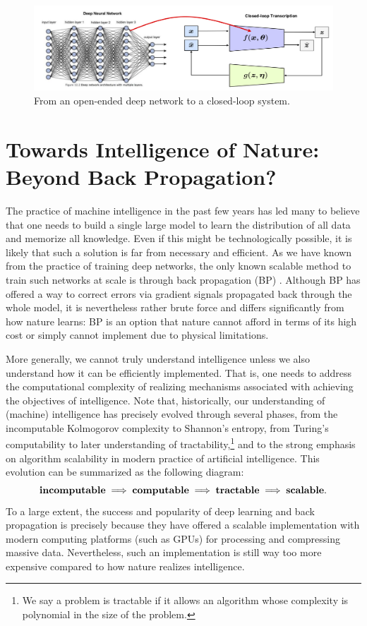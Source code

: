 \documentclass[../../book-main.tex]{subfiles}
\begin{document}
\begin{figure}[t]
    \centering    \includegraphics[width=0.9\linewidth]{figs_chap8/open-to-closed.png}
    \caption{From an open-ended deep network to a closed-loop system.}
    \label{fig:open-to-closed}
\end{figure}



\section{Towards Intelligence of Nature: Beyond Back Propagation?}
The practice of machine intelligence in the past few years has led many to believe that one needs to build a single large model to learn the distribution of all data and memorize all knowledge. Even if this might be technologically possible, it is likely that such a solution is far from necessary and efficient. As we have known from the practice of training deep networks, the only known scalable method to train such networks at scale is through back propagation (BP) \cite{Back-Prop}. Although BP has offered a way to correct errors via gradient signals propagated back through the whole model, it is nevertheless rather brute force and differs significantly from how nature learns: BP is an option that nature cannot afford in terms of its high cost or simply cannot implement due to physical limitations. 

More generally, we cannot truly understand intelligence unless we also understand how it can be efficiently implemented. That is, one needs to address the computational complexity of realizing mechanisms associated with achieving the objectives of intelligence. Note that, historically, our understanding of (machine) intelligence has precisely evolved through several phases, from the incomputable Kolmogorov complexity to Shannon's entropy, from Turing's computability to later understanding of  tractability,\footnote{We say a problem is tractable if it allows an algorithm whose complexity is polynomial in the size of the problem.} and to the strong emphasis on algorithm scalability in modern practice of artificial intelligence. This evolution can be summarized as the following diagram:
\begin{equation}
   \mbox{\textbf{incomputable}} \;
   \Longrightarrow \; \mbox{\textbf{computable}} \;
   \Longrightarrow \; \mbox{\textbf{tractable}} \; \Longrightarrow \; 
   \mbox{\textbf{scalable}}.
\end{equation}
To a large extent, the success and popularity of deep learning and back propagation is precisely because they have offered a  scalable implementation with modern computing platforms (such as GPUs) for processing and compressing massive data. Nevertheless, such an implementation is still way too more expensive compared to how nature realizes intelligence. 
\end{document}
